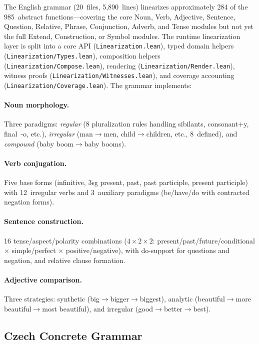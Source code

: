\documentclass[11pt]{article}
\newcommand{\code}[1]{\texttt{#1}}
\begin{document}
The English grammar (20~files, 5,890~lines) linearizes approximately 284 of
the 985~abstract functions---covering the core Noun, Verb, Adjective,
Sentence, Question, Relative, Phrase, Conjunction, Adverb, and Tense
modules but not yet the full Extend, Construction, or Symbol modules.
The runtime linearization layer is split into a core API
(\code{Linearization.lean}), typed domain helpers
(\code{Linearization/Types.lean}), composition helpers
(\code{Linearization/Compose.lean}), rendering
(\code{Linearization/Render.lean}), witness proofs
(\code{Linearization/Witnesses.lean}), and coverage accounting
(\code{Linearization/Coverage.lean}).
The grammar implements:

\paragraph{Noun morphology.}  Three paradigms: \emph{regular} (8 pluralization
rules handling sibilants, consonant+y, final~-o, etc.), \emph{irregular}
(man$\to$men, child$\to$children, etc., 8~defined), and \emph{compound}
(baby boom$\to$baby booms).

\paragraph{Verb conjugation.}  Five base forms (infinitive, 3sg present,
past, past participle, present participle) with 12~irregular verbs and
3~auxiliary paradigms (be/have/do with contracted negation forms).

\paragraph{Sentence construction.}  16 tense/aspect/polarity combinations
($4 \times 2 \times 2$: present/past/future/conditional $\times$
simple/perfect $\times$ positive/negative), with do-support for questions
and negation, and relative clause formation.

\paragraph{Adjective comparison.}  Three strategies: synthetic
(big$\to$bigger$\to$biggest), analytic (beautiful$\to$more
beautiful$\to$most beautiful), and irregular (good$\to$better$\to$best).

\subsection{Czech Concrete Grammar}
\end{document}
